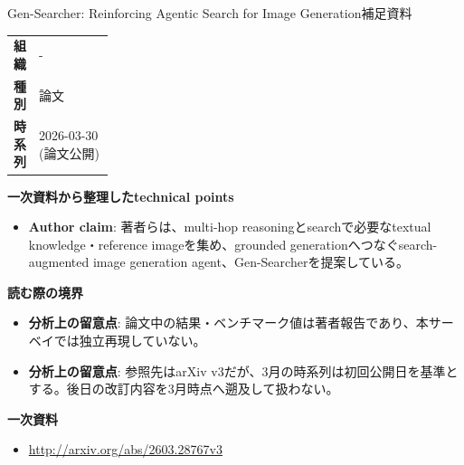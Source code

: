 \begin{technicalnote}{Gen-Searcher: Reinforcing Agentic Search for Image Generation}{補足資料}
\begingroup
\begin{tabularx}{\linewidth}{@{}>{\bfseries}p{0.22\linewidth}X@{}}
組織 & - \\
種別 & 論文 \\
時系列 & 2026-03-30 (論文公開) \\
\end{tabularx}
\smallskip
{\bfseries 一次資料から整理したtechnical points}
\begin{itemize}[leftmargin=1.5em,itemsep=0.35em]
\item \textbf{Author claim}: 著者らは、multi-hop reasoningとsearchで必要なtextual knowledge・reference imageを集め、grounded generationへつなぐsearch-augmented image generation agent、Gen-Searcherを提案している。
\end{itemize}
\begin{minipage}{\linewidth}
{\bfseries 読む際の境界}
\begin{itemize}[leftmargin=1.5em,itemsep=0.35em]
\item \textbf{分析上の留意点}: 論文中の結果・ベンチマーク値は著者報告であり、本サーベイでは独立再現していない。
\item \textbf{分析上の留意点}: 参照先はarXiv v3だが、3月の時系列は初回公開日を基準とする。後日の改訂内容を3月時点へ遡及して扱わない。
\end{itemize}
\begin{samepage}
{\bfseries 一次資料}
\begingroup\sloppy
\begin{itemize}[leftmargin=1.5em,itemsep=0.25em]
\item {\scriptsize\url{http://arxiv.org/abs/2603.28767v3}}
\end{itemize}
\endgroup
\end{samepage}
\end{minipage}
\endgroup
\end{technicalnote}
\medskip
